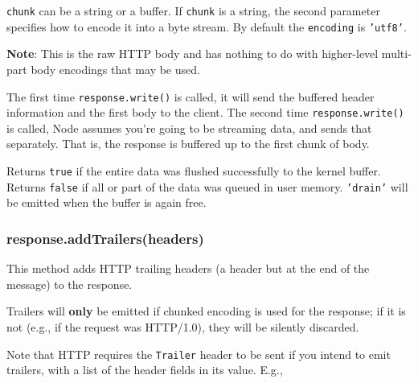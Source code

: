 \texttt{chunk} can be a string or a buffer. If \texttt{chunk} is a
string, the second parameter specifies how to encode it into a byte
stream. By default the \texttt{encoding} is \texttt{'utf8'}.

\textbf{Note}: This is the raw HTTP body and has nothing to do with
higher-level multi-part body encodings that may be used.

The first time \texttt{response.write()} is called, it will send the
buffered header information and the first body to the client. The second
time \texttt{response.write()} is called, Node assumes you're going to
be streaming data, and sends that separately. That is, the response is
buffered up to the first chunk of body.

Returns \texttt{true} if the entire data was flushed successfully to the
kernel buffer. Returns \texttt{false} if all or part of the data was
queued in user memory. \texttt{'drain'} will be emitted when the buffer
is again free.

\subsubsection{response.addTrailers(headers)}

This method adds HTTP trailing headers (a header but at the end of the
message) to the response.

Trailers will \textbf{only} be emitted if chunked encoding is used for
the response; if it is not (e.g., if the request was HTTP/1.0), they
will be silently discarded.

Note that HTTP requires the \texttt{Trailer} header to be sent if you
intend to emit trailers, with a list of the header fields in its value.
E.g.,

\begin{Shaded}
\begin{Highlighting}[]
\NormalTok{(}\NormalTok{, \{ }\NormalTok{: }\NormalTok{,}
                          \NormalTok{: } \NormalTok{\});}
\NormalTok{(\{}\NormalTok{: }\NormalTok{\});}
\NormalTok{();}
\end{Highlighting}
\end{Shaded}


